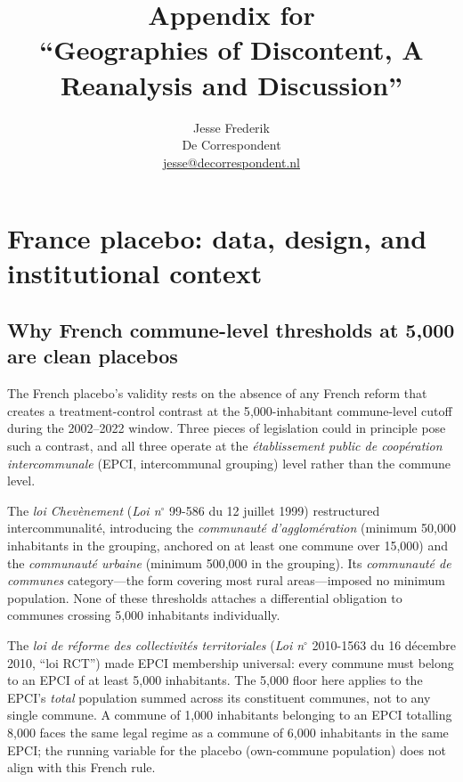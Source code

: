 \documentclass[12pt,letterpaper]{article}
\title{Appendix for\\
``Geographies of Discontent, A Reanalysis and Discussion''}
\author{}
\author{Jesse Frederik\\
  \small De Correspondent\\
  \small \href{mailto:jesse@decorrespondent.nl}{jesse@decorrespondent.nl}}
\date{}
\begin{document}
\maketitle
\thispagestyle{empty}

\tableofcontents
\newpage

\section{France placebo: data, design, and institutional context}
\label{app:france_data}

\subsection{Why French commune-level thresholds at 5{,}000 are clean placebos}
\label{app:france_institutional}

The French placebo's validity rests on the absence of any French reform that creates a treatment-control contrast at the 5{,}000-inhabitant commune-level cutoff during the 2002--2022 window. Three pieces of legislation could in principle pose such a contrast, and all three operate at the \textit{établissement public de coopération intercommunale} (EPCI, intercommunal grouping) level rather than the commune level.

The \textit{loi Chev\`enement} (\textit{Loi n}$^{\circ}$ 99-586 du 12 juillet 1999) restructured intercommunalit\'e, introducing the \textit{communaut\'e d'agglom\'eration} (minimum 50{,}000 inhabitants in the grouping, anchored on at least one commune over 15{,}000) and the \textit{communaut\'e urbaine} (minimum 500{,}000 in the grouping). Its \textit{communaut\'e de communes} category---the form covering most rural areas---imposed no minimum population. None of these thresholds attaches a differential obligation to communes crossing 5{,}000 inhabitants individually.

The \textit{loi de r\'eforme des collectivit\'es territoriales} (\textit{Loi n}$^{\circ}$ 2010-1563 du 16 d\'ecembre 2010, ``loi RCT'') made EPCI membership universal: every commune must belong to an EPCI of at least 5{,}000 inhabitants. The 5{,}000 floor here applies to the EPCI's \emph{total} population summed across its constituent communes, not to any single commune. A commune of 1{,}000 inhabitants belonging to an EPCI totalling 8{,}000 faces the same legal regime as a commune of 6{,}000 inhabitants in the same EPCI; the running variable for the placebo (own-commune population) does not align with this French rule.
\end{document}
